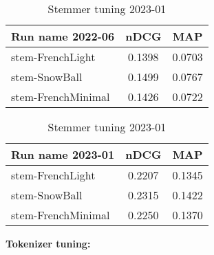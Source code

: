 \begin{table}[ht]
    \centering
    \begin{minipage}{0.48\textwidth}
        \centering
        \begin{tabular}{ |l|c|c| }
            \hline
            Run name 2022-06 & nDCG & MAP \\ [0.5ex]
            \hline\hline
            stem-FrenchLight & 0.1398 & 0.0703 \\
            \rowcolor{yellow}
            stem-SnowBall & 0.1499 & 0.0767 \\
            stem-FrenchMinimal & 0.1426 & 0.0722 \\
            \hline
        \end{tabular}
        \caption{Stemmer tuning 2022-06}
        \label{tab:stemmer-2022}
    \end{minipage}
    \hfill
    \begin{minipage}{0.48\textwidth}
        \centering
        \begin{tabular}{ |l|c|c| }
            \hline
            Run name 2023-01 & nDCG & MAP \\ [0.5ex]
            \hline\hline
            stem-FrenchLight & 0.2207 & 0.1345 \\
            \rowcolor{yellow}
            stem-SnowBall & 0.2315 & 0.1422 \\
            stem-FrenchMinimal & 0.2250 & 0.1370 \\
            \hline
        \end{tabular}
        \caption{Stemmer tuning 2023-01}
        \label{tab:stemmer-2023}
    \end{minipage}
\end{table}

\textbf{Tokenizer tuning:}

